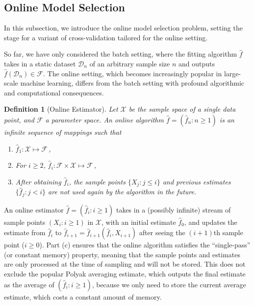 \documentclass[11pt]{article}
\theoremstyle{plain}
\newtheorem{definition}[theorem]{Definition}
\newcommand{\D}{{\mathcal{D}}}
\newcommand{\X}{{\mathcal{X}}}
\begin{document}
\subsection{Online Model Selection}\label{subsec:3.2-online-model-selection}
In this subsection, we introduce the online model selection problem, setting the stage for a variant of cross-validation tailored for the online setting.

So far, we have only considered the batch setting, where the fitting algorithm $\hat f$ takes in a static dataset $\D_n$ of an arbitrary sample size $n$ and outputs $\hat f(\D_n)\in\mathcal F$.  The online setting, which becomes increasingly popular in large-scale machine learning, differs from the batch setting with profound algorithmic and computational consequences.
\begin{definition}[Online Estimator]\label{def:3.2-online-alg}
Let $\X$ be the sample space of a single data point, and $\mathcal F$ a parameter space.
An online algorithm $\hat f=(\hat f_n:n\ge 1)$ is an infinite sequence of mappings such that
\begin{enumerate}
    \item [(a)] $\hat f_1:\X \mapsto \mathcal F$\,,
    \item [(b)] For $i\ge 2$, $\hat f_i:\mathcal F\times \X \mapsto \mathcal F$\,,
    \item [(c)] After obtaining $\hat f_i$, the sample points $\{X_j:j\le i\}$ and previous estimates $\{\hat f_j:j<i\}$ are not used again by the algorithm in the future.
\end{enumerate}
\end{definition}
An online estimator $\hat f=(\hat f_i:i\ge 1)$ takes in a (possibly infinite) stream of sample points $(X_i:i\ge 1)$ in $\X$, with an initial estimate $\hat f_0$, and updates the estimate from $\hat f_i$ to $\hat f_{i+1}=\hat f_{i+1}(\hat f_i, X_{i+1})$ after seeing the $(i+1)$th sample point ($i\ge 0$).  Part (c) ensures that the online algorithm satisfies the ``single-pass'' (or constant memory) property, meaning that the sample points and estimates are only processed at the time of sampling and will not be stored.  This does not exclude the popular Polyak averaging estimate, which outputs the final estimate as the average of $(\hat f_i:i\ge 1)$, because we only need to store the current average estimate, which costs a constant amount of memory.
\end{document}
